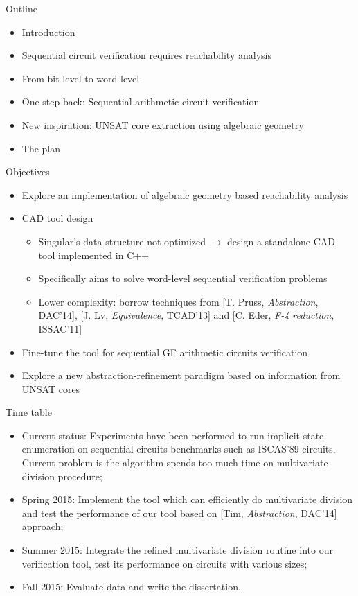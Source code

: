 \documentclass[xcolor=dvipsnames]{beamer}
\newcommand{\bi}{\begin{itemize}}
\newcommand{\ei}{\end{itemize}}
\begin{document}
\begin{frame}{\large{Outline}}
\bi
\item Introduction
\item Sequential circuit verification requires reachability analysis
\item From bit-level to word-level
\item One step back: Sequential arithmetic circuit verification
\item New inspiration: UNSAT core extraction using algebraic geometry
\item \alert{The plan}
\ei
\end{frame}
\begin{frame}{\large{Objectives}}
\bi
\item Explore an implementation of algebraic geometry based reachability analysis
\item CAD tool design
	\bi
	\item {\sc Singular}'s data structure not optimized $\to$ design a standalone CAD tool implemented in C++
	\item Specifically aims to solve word-level sequential verification problems
	\item Lower complexity: borrow techniques from [T. Pruss, {\it Abstraction}, DAC'14], [J. Lv, {\it Equivalence}, TCAD'13]
		and [C. Eder, {\it F-4 reduction}, ISSAC'11]
	\ei
\item Fine-tune the tool for sequential GF arithmetic circuits verification
\item Explore a new abstraction-refinement paradigm based on information from UNSAT cores
\ei
\end{frame}
\begin{frame}{\large{Time table}}
\begin{itemize}
\item Current status: Experiments have been performed to run implicit state enumeration on sequential circuits benchmarks
such as ISCAS'89 circuits. Current problem is the algorithm spends too much time on multivariate division procedure;
\item Spring 2015: Implement the tool which can efficiently do multivariate division and test the performance of 
our tool based on [Tim, {\it Abstraction}, DAC'14] approach;
\item Summer 2015: Integrate the refined multivariate division routine into our verification tool, test its
performance on circuits with various sizes;
\item Fall 2015: Evaluate data and write the dissertation.
\end{itemize}
\end{frame}
% 
\end{document}
